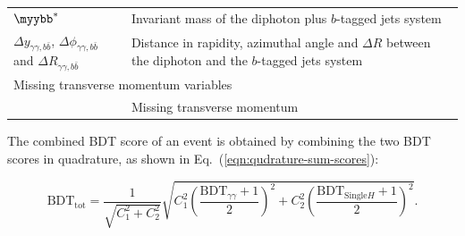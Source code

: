 \documentclass[PAPER, cernpreprint, texlive=2016, paper=a4, USenglish, texmf]{atlasdoc}
\begin{document}
\begin{table}[!htb]
\begin{tabular}{ll}
\midrule
$\myybb^{*}$    & \begin{minipage}[l]{0.55\textwidth} Invariant mass of the diphoton plus $b$-tagged jets system  \end{minipage} \\[2.5ex]
$\Delta y_{\gamma \gamma, b \bar{b}}$, $\Delta \phi_{\gamma \gamma, b  \bar{b}}$ and $\Delta R_{\gamma \gamma, b \bar{b}}$  & \begin{minipage}[l]{0.55\textwidth} Distance in rapidity, azimuthal angle and  $\Delta R$ between the diphoton and the $b$-tagged jets system  \end{minipage} \\[2ex]
\midrule
\midrule
\multicolumn{2}{l}{Missing transverse momentum  variables} \\
\midrule
\etmiss{} & \begin{minipage}[l]{0.55\textwidth} Missing transverse momentum \end{minipage}  \\[2ex]
\bottomrule
\end{tabular}
\end{table}
 
The combined BDT score of an event is obtained by combining the two BDT scores in quadrature, as shown in Eq.~(\ref{eqn:qudrature-sum-scores}):
 
\begin{equation}
\label{eqn:qudrature-sum-scores}
\textrm{BDT}_{\textrm{tot}} = \frac{1}{\sqrt{C_1^2+C_2^2}}\sqrt{C_1^2\left(\frac{\textrm{BDT}_{\gamma\gamma}+1}{2}\right)^2+C_2^2\left(\frac{\textrm{BDT}_{\mathrm{Single} H}+1}{2}\right)^2}.
\end{equation}
 
\end{document}
